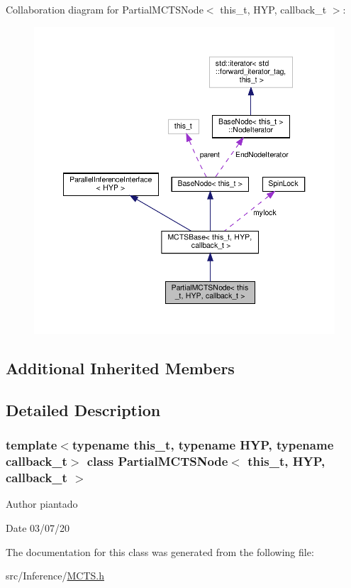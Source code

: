 Collaboration diagram for Partial\+M\+C\+T\+S\+Node$<$ this\+\_\+t, H\+YP, callback\+\_\+t $>$\+:
\nopagebreak
\begin{figure}[H]
\begin{center}
\leavevmode
\includegraphics[width=350pt]{class_partial_m_c_t_s_node__coll__graph}
\end{center}
\end{figure}
\subsection*{Additional Inherited Members}


\subsection{Detailed Description}
\subsubsection*{template$<$typename this\+\_\+t, typename H\+YP, typename callback\+\_\+t$>$\newline
class Partial\+M\+C\+T\+S\+Node$<$ this\+\_\+t, H\+Y\+P, callback\+\_\+t $>$}

\begin{DoxyAuthor}{Author}
piantado 
\end{DoxyAuthor}
\begin{DoxyDate}{Date}
03/07/20 
\end{DoxyDate}


The documentation for this class was generated from the following file\+:\begin{DoxyCompactItemize}
\item 
src/\+Inference/\hyperlink{_m_c_t_s_8h}{M\+C\+T\+S.\+h}\end{DoxyCompactItemize}
